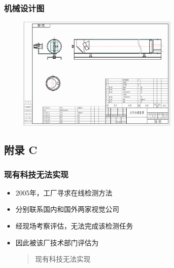 \documentclass{beamer}
\begin{document}
\begin{frame}[label=machinery]
  \frametitle{机械设计图}
  \begin{overprint}
    \begin{figure}
    \center
    \includegraphics[width=0.7\textwidth]{image/machinery}
    \end{figure}
  \end{overprint}
  \hyperlink{systemconstitute<1>}{}
\end{frame}

\subsection*{附录 C}

\begin{frame}[label=story]
  \frametitle{现有科技无法实现}
  \begin{itemize}[<+-| alert@+>]
  \item
  2005年，工厂寻求在线检测方法
  \item
  分别联系国内和国外两家视觉公司
  \item
  经现场考察评估，无法完成该检测任务
  \item
  因此被该厂技术部门评估为\\
  \begin{quote}
  现有科技无法实现
  \end{quote}
  \end{itemize}
  \hyperlink{significance<4>}{}
\end{frame}
\end{document}
